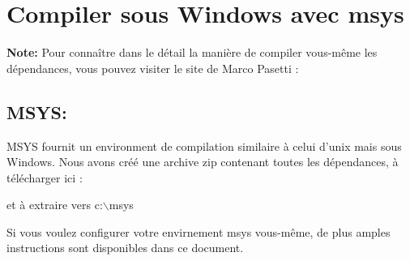 %
%
%
%
%
%
%

\section{Compiler sous Windows avec msys}\label{sec:install_windows}
\textbf{Note:} Pour connaître dans le détail la manière de compiler vous-même
les dépendances, vous pouvez visiter le site de Marco Pasetti :


\subsection{MSYS:}
MSYS fournit un environment de compilation similaire à celui d'unix mais sous
Windows. Nous avons créé une archive zip contenant toutes les dépendances, à
télécharger ici : 


et à extraire vers c:$\backslash$msys

Si vous voulez configurer votre envirnement msys vous-même, de plus amples
instructions sont disponibles dans ce document.

